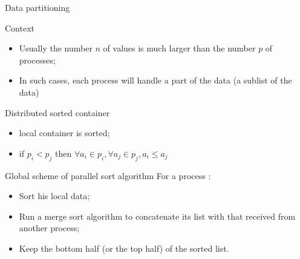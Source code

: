 \documentclass[compress,10pt,aspectratio=169]{beamer}
\begin{document}
\begin{frame}[fragile]{Data partitioning}
  \scriptsize
  \begin{block}{\small Context}
    \begin{itemize}
    \item Usually the number $n$ of values is much larger than the number $p$ of processes;
    \item In such cases, each process will handle a part of the data (a sublist of the data)
    \end{itemize}
  \end{block}

  \begin{alertblock}{\small Distributed sorted container}
    \begin{itemize}
    \item local container is sorted;
    \item if $p_{i}<p_{j}$ then
      $\forall a_{i}\in p_{i}, \forall a_{j}\in p_{j}, a_{i} \leq a_{j}$
    \end{itemize}
  \end{alertblock}
  
  \begin{exampleblock}{\small Global scheme of parallel sort algorithm}
    For a process :
    \begin{itemize}
    \item Sort his local data;
    \item Run a merge sort algorithm to concatenate its list with that received from another process;
    \item Keep the bottom half (or the top half) of the sorted list.
    \end{itemize}
  \end{exampleblock}
\end{frame}
\end{document}
